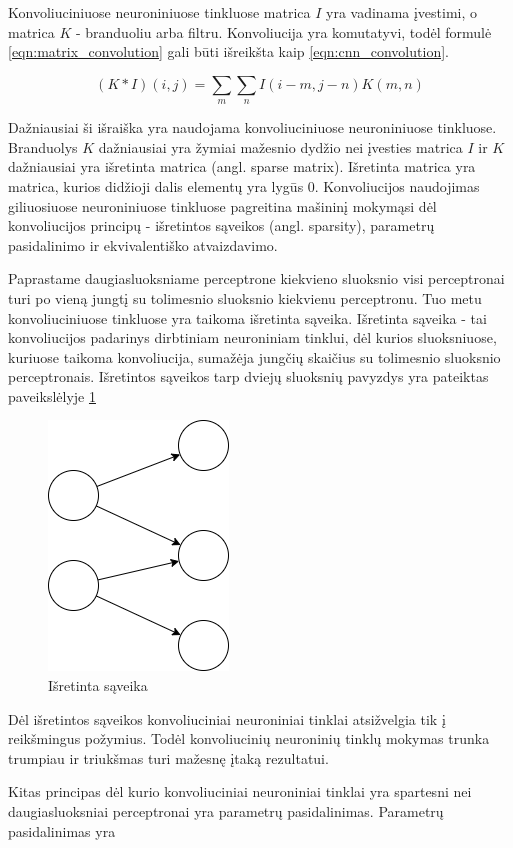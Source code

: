 Konvoliuciniuose neuroniniuose tinkluose matrica $I$ yra vadinama įvestimi, o matrica $K$ - branduoliu arba filtru. Konvoliucija yra komutatyvi, todėl formulė \ref{eqn:matrix_convolution} gali būti išreikšta kaip \ref{eqn:cnn_convolution}.

\begin{equation}
\label{eqn:cnn_convolution}
	(K * I)(i, j) = \sum_{m} \sum_{n} I(i - m, j - n) K(m, n)
\end{equation}

Dažniausiai ši išraiška yra naudojama konvoliuciniuose neuroniniuose tinkluose. Branduolys $K$ dažniausiai yra žymiai mažesnio dydžio nei įvesties matrica $I$ ir $K$ dažniausiai yra išretinta matrica (angl. sparse matrix). Išretinta matrica yra matrica, kurios didžioji dalis elementų yra lygūs 0. Konvoliucijos naudojimas giliuosiuose neuroniniuose tinkluose pagreitina mašininį mokymąsi dėl konvoliucijos principų - išretintos sąveikos (angl. sparsity), parametrų pasidalinimo ir ekvivalentiško atvaizdavimo.

Paprastame daugiasluoksniame perceptrone kiekvieno sluoksnio visi perceptronai turi po vieną jungtį su tolimesnio sluoksnio kiekvienu perceptronu. Tuo metu konvoliuciniuose tinkluose yra taikoma išretinta sąveika. Išretinta sąveika - tai konvoliucijos padarinys dirbtiniam neuroniniam tinklui, dėl kurios sluoksniuose, kuriuose taikoma konvoliucija, sumažėja jungčių skaičius su tolimesnio sluoksnio perceptronais. Išretintos sąveikos tarp dviejų sluoksnių pavyzdys yra pateiktas paveikslėlyje \ref{img:sparsity}

\begin{figure}[H]
	\centering
	\includegraphics[scale=0.5]{img/sparsity.png}
	\caption{Išretinta sąveika}
	\label{img:sparsity}
\end{figure}

Dėl išretintos sąveikos konvoliuciniai neuroniniai tinklai atsižvelgia tik į reikšmingus požymius. Todėl konvoliucinių neuroninių tinklų mokymas trunka trumpiau ir triukšmas turi mažesnę įtaką rezultatui.

Kitas principas dėl kurio konvoliuciniai neuroniniai tinklai yra spartesni nei daugiasluoksniai perceptronai yra parametrų pasidalinimas. Parametrų pasidalinimas yra 
